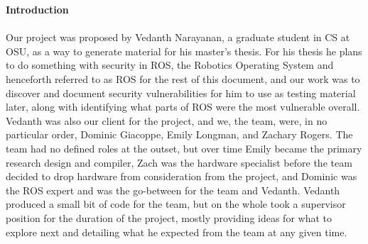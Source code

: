 \documentclass[IEEEtran,letterpaper,10pt,notitlepage,draftclsnofoot,onecolumn]{article}
\begin{document}
\LARGE\textbf{Introduction\\ \\}
\normalsize Our project was proposed by Vedanth Narayanan, a graduate student in CS at 
OSU, as a way to generate material for his master’s thesis. For his thesis 
he plans to do something with security in ROS, the Robotics Operating System 
and henceforth referred to as ROS for the rest of this document, and our 
work was to discover and document security vulnerabilities for him to use as 
testing material later, along with identifying what parts of ROS were the most 
vulnerable overall. Vedanth was also our client for the project, and we, the team, 
were, in no particular order, Dominic Giacoppe, Emily Longman, and Zachary Rogers. 
The team had no defined roles at the outset, but over time Emily became the primary 
research design and compiler, Zach was the hardware specialist before the team 
decided to drop hardware from consideration from the project, and Dominic was the 
ROS expert and was the go-between for the team and Vedanth. Vedanth produced a 
small bit of code for the team, but on the whole took a supervisor position for 
the duration of the project, mostly providing ideas for what to explore next 
and detailing what he expected from the team at any given time. \\
\end{document}

